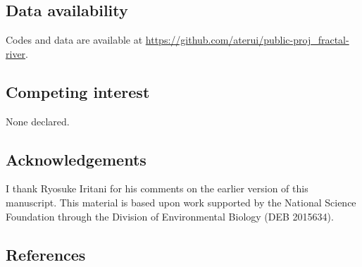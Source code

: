 \documentclass[
  12pt,
]{article}
\begin{document}
\hypertarget{data-availability}{%
\subsection{Data availability}\label{data-availability}}

Codes and data are available at \url{https://github.com/aterui/public-proj_fractal-river}.

\hypertarget{competing-interest}{%
\subsection{Competing interest}\label{competing-interest}}

None declared.

\hypertarget{acknowledgements}{%
\subsection{Acknowledgements}\label{acknowledgements}}

I thank Ryosuke Iritani for his comments on the earlier version of this manuscript. This material is based upon work supported by the National Science Foundation through the Division of Environmental Biology (DEB 2015634).

\pagebreak

\hypertarget{references}{%
\subsection*{References}\label{references}}
\end{document}
